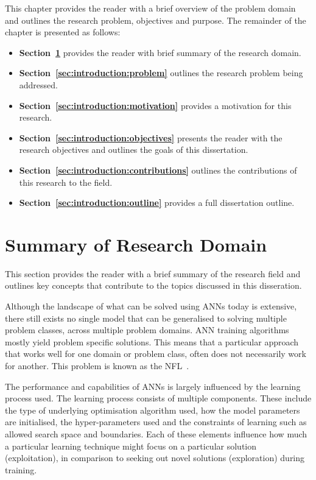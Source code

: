 This chapter provides the reader with a brief overview of the problem domain and outlines the research problem, objectives and purpose. The remainder of the chapter is presented as follows:

\begin{itemize}
      \item \textbf{Section~\ref{sec:introduction:summary_research_domain}} provides the reader with brief summary of the research domain.

      \item \textbf{Section~\ref{sec:introduction:problem}} outlines the research problem being addressed.

      \item \textbf{Section~\ref{sec:introduction:motivation}} provides a motivation for this research.

      \item \textbf{Section~\ref{sec:introduction:objectives}} presents the reader with the research objectives and outlines the goals of this dissertation.

      \item \textbf{Section~\ref{sec:introduction:contributions}} outlines the contributions of this research to the field.

      \item \textbf{Section~\ref{sec:introduction:outline}} provides a full dissertation outline.
\end{itemize}


\section{Summary of Research Domain}\label{sec:introduction:summary_research_domain}

This section provides the reader with a brief summary of the research field and outlines key concepts that contribute to the topics discussed in this disseration.

Although the landscape of what can be solved using \acp{ANN} today is extensive, there still exists no single model that can be generalised to solving multiple problem classes, across multiple problem domains. \acs{ANN} training algorithms mostly yield problem specific solutions. This means that a particular approach that works well for one domain or problem class, often does not necessarily work for another. This problem is known as the \acf{NFL}~\cite{ref:wolpert:1997}.

The performance and capabilities of \acp{ANN} is largely influenced by the learning process used. The learning process consists of multiple components. These include the type of underlying optimisation algorithm used, how the model parameters are initialised, the hyper-parameters used and the constraints of learning such as allowed search space and boundaries. Each of these elements influence how much a particular learning technique might focus on a particular solution (exploitation), in comparison to seeking out novel solutions (exploration) during training.

